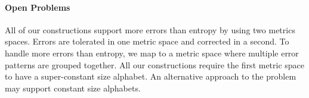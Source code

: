 \documentclass[11pt]{article}
\newcommand{\Huse}{\mathrm{H}_{\mathtt{usable}}}
\newcommand{\authnote}[2]{{\textcolor{red}{\textsf{#1 notes: }\textcolor{blue}{ #2}}\marginpar{\textcolor{red}{\textbf{!!!!!}}}}}
\newcommand{\authnote}[2]{}
\newcommand{\bnote}[1]{{\authnote{Ben}{#1}}}
\begin{document}
\paragraph{Open Problems}
All of our constructions support more errors than entropy by using two metrics spaces.  Errors are tolerated in one metric space and corrected in a second.  To handle more errors than entropy,  we map to a metric space where multiple error patterns are grouped together.  All our constructions require the first metric space to have a super-constant size alphabet.  An alternative approach to the problem may support constant size alphabets.


\end{document}
